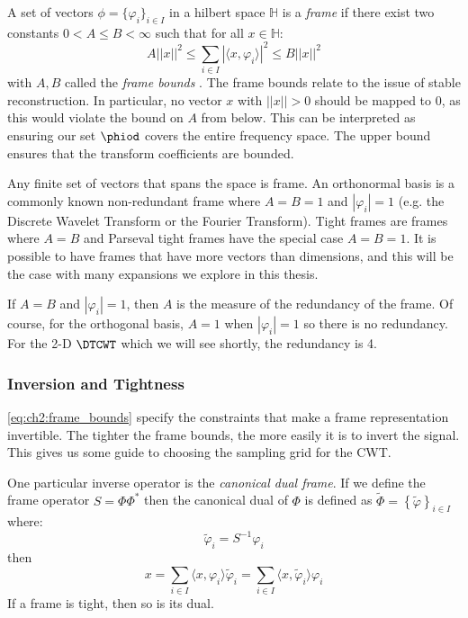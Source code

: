 A set of vectors $ \phi = \{ \varphi_i \}_{i \in I}$ in a hilbert space
$\mathbb{H}$ is a \emph{frame} if there exist two constants $0 < A\leq B <
\infty$ such that for all $x \in \mathbb{H}$:
\begin{equation}
  A||x||^2 \leq \sum_{i\in I} |\langle x, \varphi_i \rangle|^2 \leq B ||x||^2
  \label{eq:ch2:frame_bounds}
\end{equation}
with $A, B$ called the \emph{frame bounds} \cite{kovacevic_introduction_2008}.
The frame bounds relate to the issue of stable reconstruction. In particular, no
vector $x$ with $||x||>0$ should be mapped to 0, as this would violate the bound
on $A$ from below. This can be interpreted as ensuring our set $\phiod$ covers the
entire frequency space. The upper bound ensures that the transform
coefficients are bounded. 

Any finite set of vectors that spans the space is frame. An orthonormal basis
is a commonly known non-redundant frame where $A=B=1$ and $|\varphi_i|=1$ (e.g. the Discrete
Wavelet Transform or the Fourier Transform). Tight frames are frames where $A=B$
and Parseval tight frames have the special case $A=B=1$. It is possible to have frames that
have more vectors than dimensions, and this will be the case with many
expansions we explore in this thesis. 

If $A=B$ and $|\varphi_i| = 1$, then $A$ is
the measure of the redundancy of the frame. Of course, for the orthogonal basis,
$A=1$ when $|\varphi_i|=1$ so there is no redundancy. For the 2-D $\DTCWT$ which we
will see shortly, the redundancy is 4.

\subsubsection{Inversion and Tightness}
\eqref{eq:ch2:frame_bounds} specify the constraints that make a frame
representation invertible.
The tighter the frame bounds, the more easily it is to invert the signal.
This gives us some guide to choosing the sampling grid for the CWT. 

One particular inverse operator is the \emph{canonical dual frame}.
If we define the frame operator $S = \Phi\Phi^*$ then the canonical dual 
of $\Phi$ is defined as $\tilde{\Phi} = \left\{ \tilde{\varphi}\right\}_{i \in I}$
where:
\begin{equation}
  \tilde{\varphi}_i = S^{-1}\varphi_i
\end{equation}
then\cite{kovacevic_introduction_2008}
\begin{equation}
  x = \sum_{i\in I} \langle x, \varphi_i \rangle \tilde{\varphi}_i = \sum_{i\in I}
  \langle x, \tilde{\varphi}_i \rangle \varphi_i
\end{equation}
If a frame is tight, then so is its dual.


